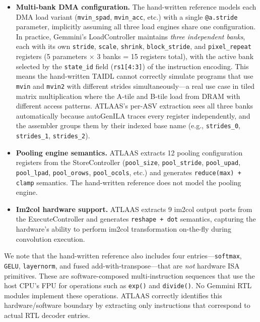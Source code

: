 \begin{itemize}
\item \textbf{Multi-bank DMA configuration.}
The hand-written reference models each DMA load variant (\texttt{mvin\_spad}, \texttt{mvin\_acc}, etc.) with a single \texttt{@a.stride} parameter, implicitly assuming all three load engines share one configuration.
In practice, Gemmini's LoadController maintains \emph{three independent banks}, each with its own \texttt{stride}, \texttt{scale}, \texttt{shrink}, \texttt{block\_stride}, and \texttt{pixel\_repeat} registers (5 parameters $\times$ 3 banks = 15 registers total), with the active bank selected by the \texttt{state\_id} field (\texttt{rs1[4:3]}) of the instruction encoding.
This means the hand-written TAIDL cannot correctly simulate programs that use \texttt{mvin} and \texttt{mvin2} with different strides simultaneously---a real use case in tiled matrix multiplication where the A-tile and B-tile load from DRAM with different access patterns.
ATLAAS's per-ASV extraction sees all three banks automatically because autoGenILA traces every register independently, and the assembler groups them by their indexed base name (e.g., \texttt{strides\_0}, \texttt{strides\_1}, \texttt{strides\_2}).

\item \textbf{Pooling engine semantics.}
ATLAAS extracts 12 pooling configuration registers from the StoreController (\texttt{pool\_size}, \texttt{pool\_stride}, \texttt{pool\_upad}, \texttt{pool\_lpad}, \texttt{pool\_orows}, \texttt{pool\_ocols}, etc.) and generates \texttt{reduce(max) + clamp} semantics.
The hand-written reference does not model the pooling engine.

\item \textbf{Im2col hardware support.}
ATLAAS extracts 9 im2col output ports from the ExecuteController and generates \texttt{reshape + dot} semantics, capturing the hardware's ability to perform im2col transformation on-the-fly during convolution execution.
\end{itemize}

We note that the hand-written reference also includes four entries---\texttt{softmax}, \texttt{GELU}, \texttt{layernorm}, and fused add-with-transpose---that are \emph{not} hardware ISA primitives.
These are software-composed multi-instruction sequences that use the host CPU's FPU for operations such as \texttt{exp()} and \texttt{divide()}.
No Gemmini RTL modules implement these operations.
ATLAAS correctly identifies this hardware/software boundary by extracting only instructions that correspond to actual RTL decoder entries.

